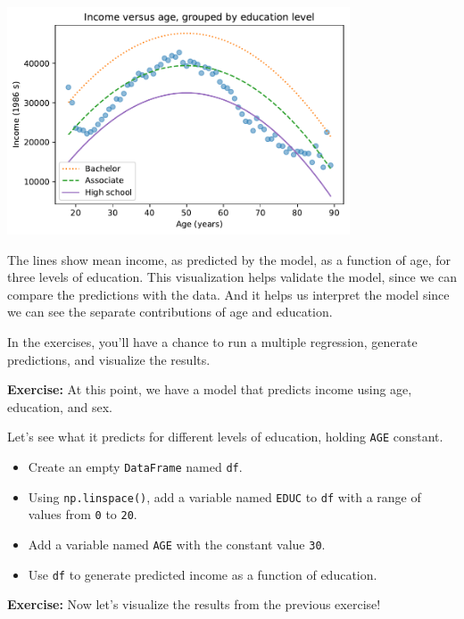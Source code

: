 \begin{center}
\includegraphics[width=4in]{chapters/10_regression_files/10_regression_56_0.pdf}
\end{center}

The lines show mean income, as predicted by the model, as a function of
age, for three levels of education. This visualization helps validate
the model, since we can compare the predictions with the data. And it
helps us interpret the model since we can see the separate contributions
of age and education.

In the exercises, you'll have a chance to run a multiple regression,
generate predictions, and visualize the results.

\textbf{Exercise:} At this point, we have a model that predicts income
using age, education, and sex.

Let's see what it predicts for different levels of education, holding
\passthrough{\lstinline!AGE!} constant.

\begin{itemize}
\item
  Create an empty \passthrough{\lstinline!DataFrame!} named
  \passthrough{\lstinline!df!}.
\item
  Using \passthrough{\lstinline!np.linspace()!}, add a variable named
  \passthrough{\lstinline!EDUC!} to \passthrough{\lstinline!df!} with a
  range of values from \passthrough{\lstinline!0!} to
  \passthrough{\lstinline!20!}.
\item
  Add a variable named \passthrough{\lstinline!AGE!} with the constant
  value \passthrough{\lstinline!30!}.
\item
  Use \passthrough{\lstinline!df!} to generate predicted income as a
  function of education.
\end{itemize}

\textbf{Exercise:} Now let's visualize the results from the previous
exercise!

